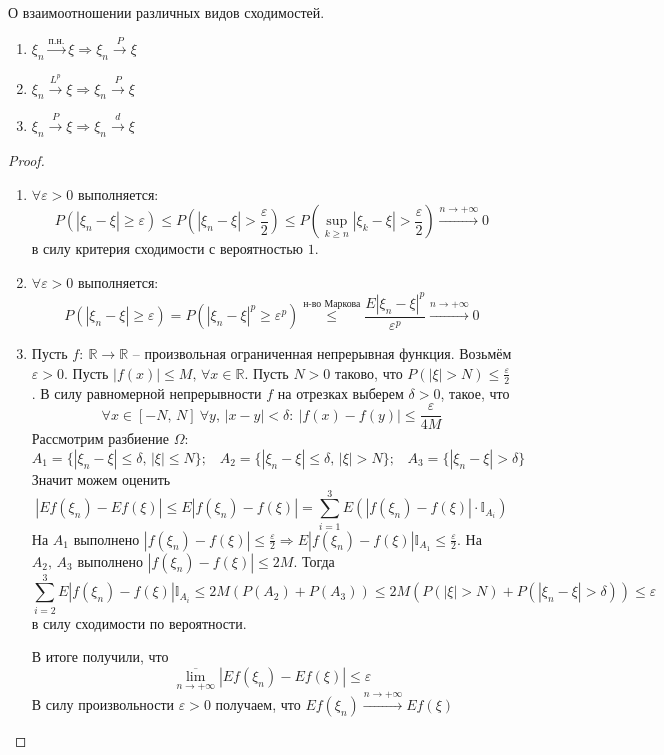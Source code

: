 \begin{theorem}
	О взаимоотношении различных видов сходимостей.

	\begin{enumerate}
		\item $\xi_n \stackrel{\text{п.н.}}{\to} \xi \Rightarrow \xi_n \stackrel{P}{\to} \xi$
		\item $\xi_n \stackrel{L^p}{\to} \xi \Rightarrow \xi_n \stackrel{P}{\to} \xi$
		\item $\xi_n \stackrel{P}{\to} \xi \Rightarrow \xi_n \stackrel{d}{\to} \xi$
	\end{enumerate}
\end{theorem}

\begin{proof}
	\begin{enumerate}
		\item $\forall \varepsilon > 0$ выполняется:
		      \[P(|\xi_n - \xi| \geq \varepsilon) \leq P\left(|\xi_n - \xi| > \frac{\varepsilon}{2}\right) \leq P\left(\sup_{k \geq n}|\xi_k - \xi| > \frac{\varepsilon}{2}\right) \stackrel{n \to +\infty}{\to} 0\]
		      в силу критерия сходимости с вероятностью $1$.

		\item $\forall \varepsilon > 0$ выполняется:
		      \[P(|\xi_n - \xi| \geq \varepsilon) = P(|\xi_n - \xi|^p \geq \varepsilon^p) \stackrel{\text{н-во Маркова}}{\leq} \frac{E|\xi_n - \xi|^p}{\varepsilon^p} \stackrel{n \to +\infty}{\to} 0\]

		\item Пусть $f:\: \mathbb{R} \to \mathbb{R}$ -- произвольная ограниченная непрерывная функция. Возьмём $\varepsilon > 0$.  Пусть $|f(x)| \leq M,\, \forall x \in \mathbb{R}$. Пусть $N > 0$ таково, что $P(|\xi| > N) \leq \frac{\varepsilon}{2}$. В силу равномерной непрерывности $f$ на отрезках выберем $\delta > 0$, такое, что
		      \[\forall x \in [-N,\, N] \: \forall y,\, |x - y| < \delta:\: |f(x) - f(y)| \leq \frac{\varepsilon}{4M}\]
		      Рассмотрим разбиение $\Omega$:
		      \[A_1 = \{|\xi_n - \xi| \leq \delta,\, |\xi| \leq N\};\;\;\; A_2 = \{|\xi_n - \xi| \leq \delta,\, |\xi| > N\};\;\;\; A_3 = \{|\xi_n - \xi| > \delta\}\]
		      Значит можем оценить
		      \[|Ef(\xi_n) - Ef(\xi)| \leq E|f(\xi_n) - f(\xi)| = \sum_{i = 1}^3 E(|f(\xi_n) - f(\xi)|\cdot\mathbb{I}_{A_i})\]
		      На $A_1$ выполнено $|f(\xi_n) - f(\xi)| \leq \frac{\varepsilon}{2} \Rightarrow E|f(\xi_n) - f(\xi)|\mathbb{I}_{A_1} \leq \frac{\varepsilon}{2}$. На $A_2,\, A_3$ выполнено $|f(\xi_n) - f(\xi)| \leq 2M$. Тогда
		      \[\sum_{i = 2}^3 E|f(\xi_n) - f(\xi)|\mathbb{I}_{A_i} \leq 2M(P(A_2) + P(A_3)) \leq 2M(P(|\xi| > N) + P(|\xi_n - \xi| > \delta)) \leq \varepsilon\]
		      в силу сходимости по вероятности.

		      В итоге получили, что
		      \[\overline{\lim_{n \to +\infty}}|Ef(\xi_n) - Ef(\xi)| \leq \varepsilon\]
		      В силу произвольности $\varepsilon > 0$ получаем, что $Ef(\xi_n) \stackrel{n \to +\infty}{\to} Ef(\xi)$
	\end{enumerate}
\end{proof}
